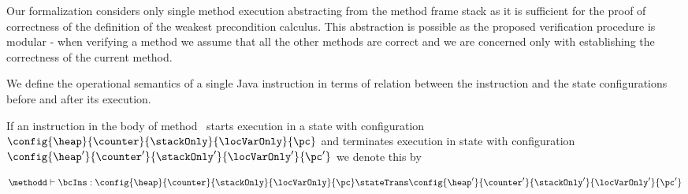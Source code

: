  Our formalization considers only single method execution abstracting from the method frame stack as it is sufficient for
 the proof of correctness of the definition of the weakest precondition calculus. This abstraction is possible as the proposed verification procedure is modular - 
 when verifying a method we assume that all the other methods are correct and we are concerned
 only with establishing the correctness of the current method.

 


 We define the operational semantics of a single Java instruction in terms of
 relation between the instruction and the state configurations
 before and after its execution.

 \begin{StateTransition} \label{stateTrans} 
 If an instruction \bcIns in the body of method \methodd \ starts execution in a state with configuration  
 $\config{ \heap}{\counter}{\stackOnly}{\locVarOnly}{ \pc}$ and
  terminates execution in state with configuration  $\config{ \heap'}{\counter'}{\stackOnly'}{\locVarOnly'}{\pc'}$ we denote this by

  $$ \methodd \vdash \bcIns : \config{ \heap}{\counter}{\stackOnly}{\locVarOnly}{ \pc }   \stateTrans \config{ \heap'}{\counter'}{\stackOnly'}{\locVarOnly'}{\pc'} $$
 \end{StateTransition}

